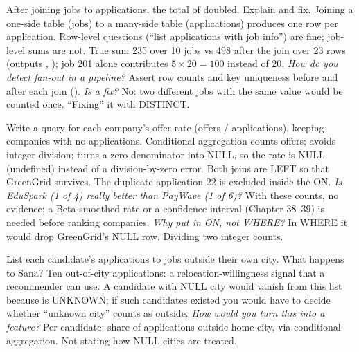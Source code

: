 \begin{qa}{After joining jobs to applications, the total of  doubled. Explain and fix.}
\why Joining a one-side table (jobs) to a many-side table (applications) produces one row per application. Row-level questions (``list applications with
job info'') are fine; job-level sums are not.
\worked True sum 235 over 10 jobs vs 498 after the join over 23 rows (outputs , ); job 201 alone contributes
$5 \times 20 = 100$ instead of 20.
\pushes \emph{How do you detect fan-out in a pipeline?} Assert row counts and key uniqueness before and after each join
(). \emph{Is  a fix?} No: two different jobs with the same value would be
counted once.
\pitfall ``Fixing'' it with DISTINCT.
\end{qa}

\begin{qa}{Write a query for each company's offer rate (offers / applications), keeping companies with no applications.}
\why Conditional aggregation counts offers;  avoids integer division;  turns a zero denominator into NULL, so the rate is
NULL (undefined) instead of a division-by-zero error. Both joins are LEFT so that GreenGrid survives. The duplicate application 22 is excluded inside
the ON.
\pushes \emph{Is EduSpark (1 of 4) really better than PayWave (1 of 6)?} With these counts, no evidence; a Beta-smoothed rate or a confidence interval
(Chapter 38--39) is needed before ranking companies. \emph{Why put  in ON, not WHERE?} In WHERE it would drop GreenGrid's NULL row.
\pitfall Dividing two integer counts.
\end{qa}

\begin{qa}{List each candidate's applications to jobs outside their own city. What happens to Sana?}
\why Ten out-of-city applications: a relocation-willingness signal that a recommender can use. A candidate with NULL city would vanish from this list
because  is UNKNOWN; if such candidates existed you would have to decide whether ``unknown city'' counts as outside.
\pushes \emph{How would you turn this into a feature?} Per candidate: share of applications outside home city, via conditional aggregation.
\pitfall Not stating how NULL cities are treated.
\end{qa}


